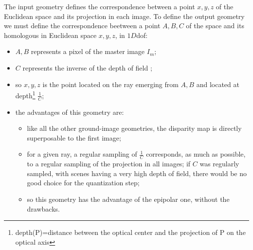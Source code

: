 The input geometry defines the correspondence between a point $x,y,z$ of
the Euclidean space and its projection in each image. To define the output
geometry we must define the correspondence beetween a point $A,B,C$ of
the  space and its homologous in Euclidean space $x,y,z$, in $1D$dof:

\begin{itemize}
   \item  $A,B$ represents a pixel of the master image $I_m$;
   \item  $C$ represents the inverse of the depth of field ;
   \item so $x,y,z$ is the point located on the ray emerging from $A,B$ and
         located at depth\footnote{depth(P)=distance between the optical center and the projection of P on the optical axis} $\frac1C$;
   \item the advantages of this geometry are:
\begin{itemize}
   \item like all the other ground-image geometries, the disparity map is directly superposable to 
          the first image;
   \item for a given ray, a regular sampling of  $\frac1C$ corresponds, as much as possible, to a regular sampling
         of the projection in all images; if $C$ was regularly sampled, with scenes having a very high depth
         of field, there would be no good choice for the quantization step;
    \item so this geometry has the advantage of the epipolar one, without the drawbacks.
\end{itemize}
\end{itemize}



